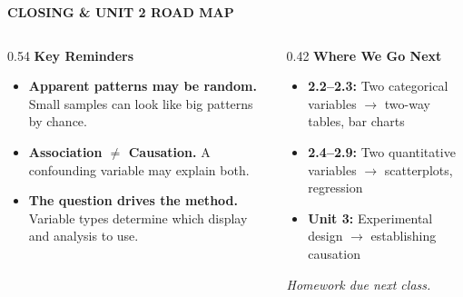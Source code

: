\documentclass[aspectratio=169, 11pt]{beamer}
\begin{document}
{
\begin{frame}[t, plain]
  \vspace{0.45cm}\par
  \hspace{0.55cm}%
  \begin{minipage}{0.9\textwidth}
    {\color{goldacc}\bfseries\footnotesize\MakeUppercase{Closing \& Unit 2 Road Map}}
    \vspace{0.45cm}\par
    \begin{columns}[T]

      \begin{column}{0.54\textwidth}
        \small
        {\color{goldacc}\bfseries Key Reminders}\\[5pt]
        \begin{itemize}
          \setlength{\itemsep}{0.4em}\setlength{\topsep}{0em}
          \item {\color{white}\textbf{Apparent patterns may be random.}
            {\color{skymid} Small samples can look like big patterns by chance.}}
          \item {\color{white}\textbf{Association $\neq$ Causation.}
            {\color{skymid} A confounding variable may explain both.}}
          \item {\color{white}\textbf{The question drives the method.}
            {\color{skymid} Variable types determine which display and analysis to use.}}
        \end{itemize}
      \end{column}

      \begin{column}{0.42\textwidth}
        \small
        {\color{goldacc}\bfseries Where We Go Next}\\[5pt]
        \begin{itemize}
          \setlength{\itemsep}{0.35em}\setlength{\topsep}{0em}
          \item {\color{white}\textbf{2.2--2.3:} Two categorical variables
            $\to$ two-way tables, bar charts}
          \item {\color{white}\textbf{2.4--2.9:} Two quantitative variables
            $\to$ scatterplots, regression}
          \item {\color{white}\textbf{Unit 3:} Experimental design
            $\to$ establishing causation}
        \end{itemize}
        \vspace{0.5cm}
        {\color{skymid}\itshape\small Homework due next class.}
      \end{column}


\end{columns}
\end{minipage}
\end{frame}}
\end{document}
